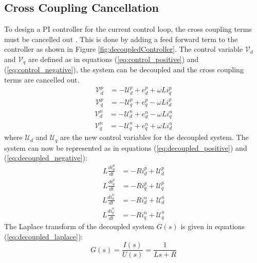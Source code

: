 \subsection{Cross Coupling Cancellation}
To design a PI controller for the current control loop, the cross coupling terms must be cancelled out \cite{electronics12112417, sanjuan2010voltage}.
This is done by adding a feed forward term to the controller as shown in Figure \ref{fig:decoupledController}.
The control variable $\mathcal{V}_{d}$ and $\mathcal{V}_{q}$ are defined as in equations (\ref{eq:control_positive})
and (\ref{eq:control_negative}), the system can be decoupled and the cross coupling terms are cancelled out.
\begin{equation}
    \begin{split}
        \mathcal{V}_{d}^{p}    &= -\mathcal{U}_{d}^{p} + e_{d}^{p} + \omega L i_{q}^{p} \\
        \mathcal{V}_{q}^{p}    &= -\mathcal{U}_{q}^{p} + e_{q}^{p} - \omega L i_{d}^{p}
    \end{split}
    \label{eq:control_positive}
\end{equation}
\begin{equation}
    \begin{split}
        \mathcal{V}_{d}^{n}    &= -\mathcal{U}_{d}^{n} + e_{d}^{n} - \omega L i_{q}^{n} \\
        \mathcal{V}_{q}^{n}    &= -\mathcal{U}_{q}^{n} + e_{q}^{n} + \omega L i_{d}^{n}
    \end{split}
    \label{eq:control_negative}
\end{equation}
where $\mathcal{U}_{d}$ and $\mathcal{U}_{q}$ are the new control variables for the decoupled system.
The system can now be represented as in equations (\ref{eq:decoupled_positive}) and (\ref{eq:decoupled_negative}):
\begin{equation}
    \begin{split}
        L \frac{di_{d}^{p}}{dt} &= -R i_{d}^{p} +  \mathcal{U}_{d}^{p}\\
        L \frac{di_{q}^{p}}{dt} &= -R i_{q}^{p} +  \mathcal{U}_{q}^{p}
    \end{split}
    \label{eq:decoupled_positive}
\end{equation}
\begin{equation}
    \begin{split}
        L \frac{di_{d}^{n}}{dt} &= -R i_{d}^{n} +  \mathcal{U}_{d}^{n}\\
        L \frac{di_{q}^{n}}{dt} &= -R i_{q}^{n} +  \mathcal{U}_{q}^{n}
    \end{split}
    \label{eq:decoupled_negative}
\end{equation}
The Laplace transform of the decoupled system $G(s)$ is given in equations (\ref{eq:decoupled_laplace}):
\begin{equation}
    G(s) = \frac{I(s)}{U(s)} = \frac{1}{Ls + R}
    \label{eq:decoupled_laplace}
\end{equation}
